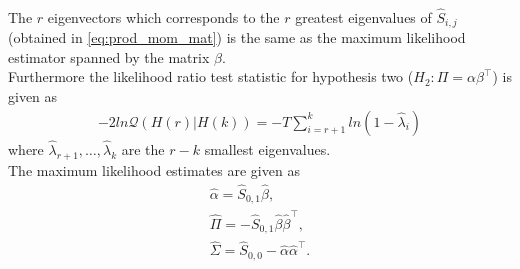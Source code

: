 \begin{thm}{\phantom}\\
    The $r$ eigenvectors which corresponds to the $r$ greatest eigenvalues of $\hat{S}_{i,j}$ (obtained in \eqref{eq:prod_mom_mat}) is the same as the maximum likelihood estimator spanned by the matrix $\beta$.\\
    Furthermore the likelihood ratio test statistic for hypothesis two ($H_2:\Pi=\alpha\beta^{\top}$) is given as 
    \begin{align}\label{eq:lrmax_coint_r}
        -2ln\mathcal{Q}(H(r)|H(k))=-T\sum_{i=r+1}^k ln(1-\hat{\lambda}_i)
    \end{align}
    where $\hat{\lambda}_{r+1},\ldots,\hat{\lambda}_{k}$ are the $r-k$ smallest eigenvalues.\\
    The maximum likelihood estimates are given as
    \begin{align*}
        \hat{\alpha}=\hat{S}_{0,1}\hat{\beta},\\
        \hat{\Pi}=-\hat{S}_{0,1}\hat{\beta}\hat{\beta}^\top,\\
        \hat{\Sigma}=\hat{S}_{0,0}-\hat{\alpha}\hat{\alpha}^\top.
    \end{align*}
\end{thm}
